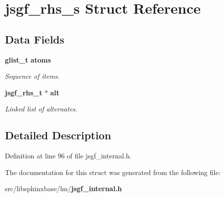 \section{jsgf\-\_\-rhs\-\_\-s Struct Reference}
\label{structjsgf__rhs__s}
\subsection*{Data Fields}
\begin{DoxyCompactItemize}
\item 
{\bf glist\-\_\-t} {\bf atoms}\label{structjsgf__rhs__s_a53c517a31c83eb357764fb891bba7008}

\begin{DoxyCompactList}\small\item\em Sequence of items. \end{DoxyCompactList}\item 
{\bf jsgf\-\_\-rhs\-\_\-t} $\ast$ {\bf alt}\label{structjsgf__rhs__s_ad07cf44d48798d86633b37e9e6e67ff5}

\begin{DoxyCompactList}\small\item\em Linked list of alternates. \end{DoxyCompactList}\end{DoxyCompactItemize}


\subsection{Detailed Description}


Definition at line 96 of file jsgf\-\_\-internal.\-h.



The documentation for this struct was generated from the following file\-:\begin{DoxyCompactItemize}
\item 
src/libsphinxbase/lm/{\bf jsgf\-\_\-internal.\-h}\end{DoxyCompactItemize}
